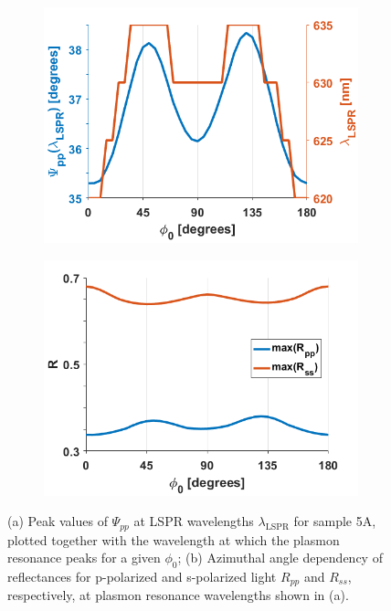 \begin{figure}[h!]
    \begin{subfigure}{0.49\textwidth}
        \centering
        \includegraphics[width=0.9\linewidth, trim=0cm  0cm 0cm 0cm, clip]{figures/ch4/S5A/S5A_Psipp_at_LSPR(2).png}
        \caption{}
        \label{fig:S5A_LSPRvsphi_Psipp}
    \end{subfigure}
    \begin{subfigure}{0.49\textwidth}
        \centering
        \includegraphics[width=0.9\linewidth, trim=0cm  0cm 1cm 0cm, clip]{figures/ch4/S5A/S5A_maxRpp_maxRss(1).png}
        \caption{}
        \label{fig:S5A_LSPRvsphi_RppRss}
    \end{subfigure}
    \caption{(a) Peak values of $\Psi_{pp}$ at LSPR wavelengths $\lambda_{\text{LSPR}}$ for sample 5A, plotted together with the wavelength at which the plasmon resonance peaks for a given $\phi_0$; (b) Azimuthal angle dependency of reflectances for p-polarized and s-polarized light $R_{pp}$ and $R_{ss}$, respectively, at plasmon resonance wavelengths shown in (a).}
    \label{fig:S5A_LSPRvsphi}
\end{figure}
